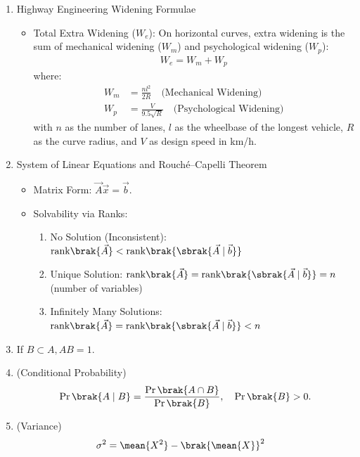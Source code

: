 \begin{enumerate}[label=\thesubsection.\arabic*, ref=\thesubsection.\theenumi,itemsep=0pt]
\item Highway Engineering Widening Formulae
\begin{itemize}
\item Total Extra Widening ($W_e$): On horizontal curves, extra widening is the sum of mechanical widening ($W_m$) and psychological widening ($W_p$):
\begin{align}
W_e = W_m + W_p \label{eq:total_widening}
\end{align}
where:
\begin{align}
W_m &= \frac{n l^2}{2R} \quad \text{(Mechanical Widening)} \label{eq:mechanical_widening} \\
W_p &= \frac{V}{9.5 \sqrt{R}} \quad \text{(Psychological Widening)} \label{eq:psychological_widening}
\end{align}
with $n$ as the number of lanes, $l$ as the wheelbase of the longest vehicle, $R$ as the curve radius, and $V$ as design speed in km/h.
\end{itemize}

\item System of Linear Equations and Rouch\'{e}--Capelli Theorem
\begin{itemize}
\item Matrix Form: $\vec{A}\vec{x} = \vec{b}$.
\item Solvability via Ranks:
\begin{enumerate}
    \item No Solution (Inconsistent): $\text{rank}\brak{\vec{A}} < \text{rank}\brak{\sbrak{\vec{A} \mid \vec{b}}}$
    \item Unique Solution: $\text{rank}\brak{\vec{A}} = \text{rank}\brak{\sbrak{\vec{A} \mid \vec{b}}} = n$ (number of variables)
    \item Infinitely Many Solutions: $\text{rank}\brak{\vec{A}} = \text{rank}\brak{\sbrak{\vec{A} \mid \vec{b}}} < n$
\end{enumerate}
\end{itemize}
\fi
%
\item	If $B \subset A, AB = 1$. 
	\label{eq:subset}
\item (Conditional Probability) 
\begin{align}
	\Pr\brak{A \mid B} = \frac{\Pr\brak{A \cap B}}{\Pr\brak{B}}, \quad \Pr\brak{B} > 0. 
	\label{eq:cond-prob}
\end{align}
	
\item (Variance) 
\begin{align}
	\sigma^2 &= \mean{X^2} - \brak{\mean{X}}^2 
	\label{eq:discrete_variance}
\end{align}

\end{enumerate}

